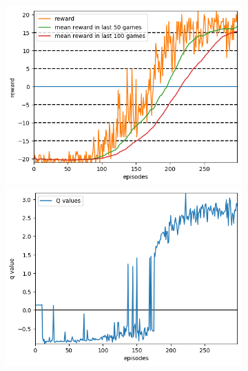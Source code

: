 \documentclass[10pt]{article}
\begin{document}
\begin{figure}
	\centering
	\begin{subfigure}{0.49\textwidth}
		\begin{minipage}{\linewidth}
			\includegraphics[width=\linewidth]{DDQN_reward.png}
		\end{minipage}\vfill
		\begin{minipage}{\linewidth}
			\includegraphics[width=\linewidth]{DDQN_qval.png}
		\end{minipage}\vfill
		\begin{minipage}{\linewidth}

\end{minipage}
\end{subfigure}
\end{figure}
\end{document}
